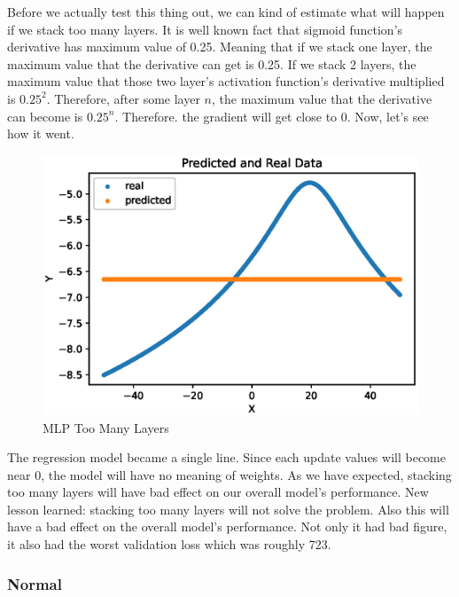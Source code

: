 \documentclass{homework}
\begin{document}
Before we actually test this thing out, we can kind of estimate what will happen if we stack too many layers. It is well known fact that sigmoid function's derivative has maximum value of 0.25. Meaning that if we stack one layer, the maximum value that the derivative can get is 0.25. If we stack 2 layers, the maximum value that those two layer's activation function's derivative multiplied is $0.25^2$. Therefore, after some layer $n$, the maximum value that the derivative can become is $0.25^n$. Therefore. the gradient will get close to 0. Now, let's see how it went. 

\begin{figure}[h]
  \centering
  \includegraphics[scale=0.7]{multilayer_failure_1.eps}
  \caption{MLP Too Many Layers}
\end{figure}
\pagebreak

The regression model became a single line. Since each update values will become near 0, the model will have no meaning of weights. As we have expected, stacking too many layers will have bad effect on our overall model's performance. New lesson learned: stacking too many layers will not solve the problem. Also this will have a bad effect on the overall model's performance. Not only it had bad figure, it also had the worst validation loss which was roughly 723.

\subsubsection{Normal}
\end{document}
